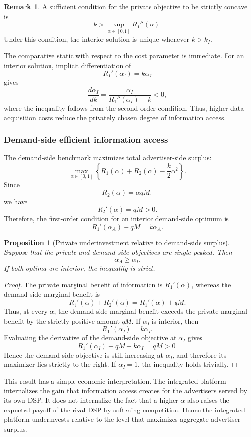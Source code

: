 \documentclass[11pt]{article}
\theoremstyle{plain}
\theoremstyle{definition}
\newtheorem{rem}[thm]{Remark}
\theoremstyle{plain}
\theoremstyle{plain}
\theoremstyle{plain}
\theoremstyle{plain}
\newtheorem{prop}[thm]{Proposition}
\numberwithin{equation}{section}
\begin{document}
\begin{rem}
A sufficient condition for the private objective to be strictly concave is
\[
k>\sup_{\alpha\in[0,1]} R_1''(\alpha).
\]
Under this condition, the interior solution is unique whenever $k>\bar k_I$.
\end{rem}

The comparative static with respect to the cost parameter is immediate. For an interior solution,
implicit differentiation of
\[
R_1'(\alpha_I)=k\alpha_I
\]
gives
\[
\frac{d\alpha_I}{dk}
=
\frac{\alpha_I}{R_1''(\alpha_I)-k}<0,
\]
where the inequality follows from the second-order condition. Thus, higher data-acquisition
costs reduce the privately chosen degree of information access.

\subsubsection{Demand-side efficient information access}

The demand-side benchmark maximizes total advertiser-side surplus:
\[
\max_{\alpha\in[0,1]}
\left\{
R_1(\alpha)+R_2(\alpha)-\frac{k}{2}\alpha^2
\right\}.
\]
Since
\[
R_2(\alpha)=\alpha qM,
\]
we have
\[
R_2'(\alpha)=qM>0.
\]
Therefore, the first-order condition for an interior demand-side optimum is
\[
R_1'(\alpha_A)+qM=k\alpha_A.
\]

\begin{prop}[Private underinvestment relative to demand-side surplus]
Suppose that the private and demand-side objectives are single-peaked. Then
\[
\alpha_A\ge \alpha_I.
\]
If both optima are interior, the inequality is strict.
\end{prop}

\begin{proof}
The private marginal benefit of information is $R_1'(\alpha)$, whereas the demand-side marginal
benefit is
\[
R_1'(\alpha)+R_2'(\alpha)=R_1'(\alpha)+qM.
\]
Thus, at every $\alpha$, the demand-side marginal benefit exceeds the private marginal benefit
by the strictly positive amount $qM$. If $\alpha_I$ is interior, then
\[
R_1'(\alpha_I)=k\alpha_I.
\]
Evaluating the derivative of the demand-side objective at $\alpha_I$ gives
\[
R_1'(\alpha_I)+qM-k\alpha_I=qM>0.
\]
Hence the demand-side objective is still increasing at $\alpha_I$, and therefore its maximizer
lies strictly to the right. If $\alpha_I=1$, the inequality holds trivially.
\end{proof}

This result has a simple economic interpretation. The integrated platform internalizes the gain
that information access creates for the advertisers served by its own DSP. It does not internalize
the fact that a higher $\alpha$ also raises the expected payoff of the rival DSP by softening
competition. Hence the integrated platform underinvests relative to the level that maximizes
aggregate advertiser surplus.
\end{document}
